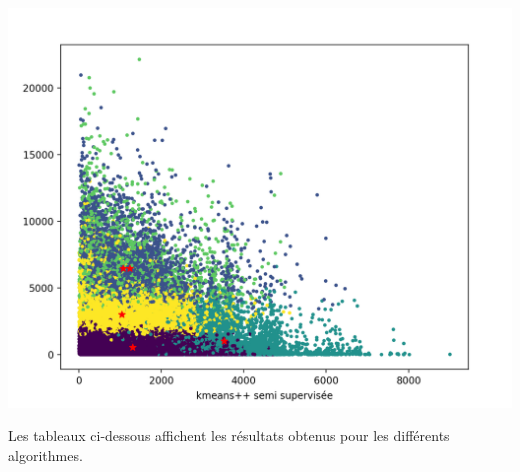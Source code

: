 \documentclass[ ]{article}
\begin{document}
\begin{center}
\includegraphics[scale=0.50]{kmeanspp_ss.png}
\end{center}


\vspace{10 mm}
\noindent
Les tableaux ci-dessous affichent les résultats obtenus pour les différents algorithmes.
\end{document}
